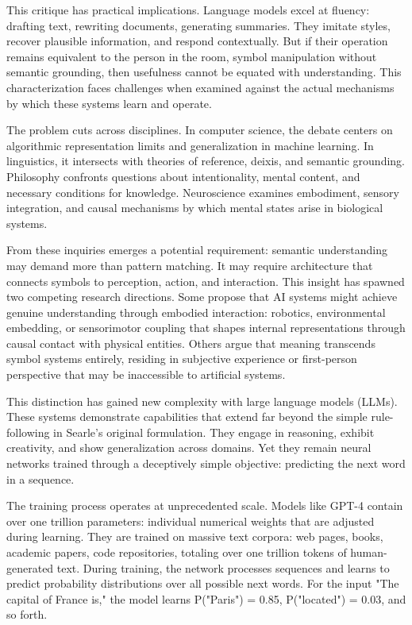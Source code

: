 This critique has practical implications. Language models excel at fluency: drafting text, rewriting documents, generating summaries. They imitate styles, recover plausible information, and respond contextually. But if their operation remains equivalent to the person in the room, symbol manipulation without semantic grounding, then usefulness cannot be equated with understanding. This characterization faces challenges when examined against the actual mechanisms by which these systems learn and operate.

The problem cuts across disciplines. In computer science, the debate centers on algorithmic representation limits and generalization in machine learning. In linguistics, it intersects with theories of reference, deixis, and semantic grounding. Philosophy confronts questions about intentionality, mental content, and necessary conditions for knowledge. Neuroscience examines embodiment, sensory integration, and causal mechanisms by which mental states arise in biological systems.

From these inquiries emerges a potential requirement: semantic understanding may demand more than pattern matching. It may require architecture that connects symbols to perception, action, and interaction. This insight has spawned two competing research directions. Some propose that AI systems might achieve genuine understanding through embodied interaction: robotics, environmental embedding, or sensorimotor coupling that shapes internal representations through causal contact with physical entities. Others argue that meaning transcends symbol systems entirely, residing in subjective experience or first-person perspective that may be inaccessible to artificial systems.

This distinction has gained new complexity with large language models (LLMs). These systems demonstrate capabilities that extend far beyond the simple rule-following in Searle's original formulation. They engage in reasoning, exhibit creativity, and show generalization across domains. Yet they remain neural networks trained through a deceptively simple objective: predicting the next word in a sequence.

The training process operates at unprecedented scale. Models like GPT-4 contain over one trillion parameters: individual numerical weights that are adjusted during learning. They are trained on massive text corpora: web pages, books, academic papers, code repositories, totaling over one trillion tokens of human-generated text. During training, the network processes sequences and learns to predict probability distributions over all possible next words. For the input "The capital of France is," the model learns P("Paris") = 0.85, P("located") = 0.03, and so forth.

